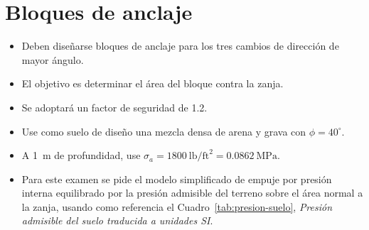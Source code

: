 \documentclass[11pt]{article}
\begin{document}
\section{Bloques de anclaje}
\begin{itemize}
\item Deben diseñarse bloques de anclaje para los tres cambios de dirección de mayor ángulo.
\item El objetivo es determinar el área del bloque contra la zanja.
\item Se adoptará un factor de seguridad de \num{1.2}.
\item Use como suelo de diseño una mezcla densa de arena y grava con $\phi = 40^\circ$.
\item A \SI{1}{\meter} de profundidad, use $\sigma_a = \num{1800}\ \text{lb/ft}^2 = \SI{0.0862}{\mega\pascal}$.
\item Para este examen se pide el modelo simplificado de empuje por presión interna equilibrado por la presión admisible del terreno sobre el área normal a la zanja, usando como referencia el Cuadro~\ref{tab:presion-suelo}, \emph{Presión admisible del suelo traducida a unidades SI}.
\end{itemize}
\end{document}
